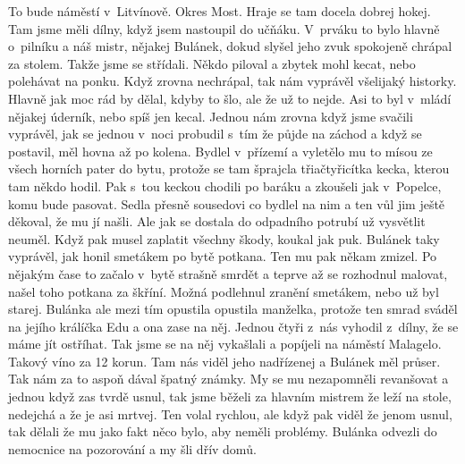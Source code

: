 
To bude náměstí v~Litvínově. Okres Most. Hraje se tam docela dobrej
hokej. Tam jsme měli dílny, když jsem nastoupil do učňáku. V~prváku to
bylo hlavně o~pilníku a náš mistr, nějakej Bulánek, dokud slyšel jeho
zvuk spokojeně chrápal za stolem. Takže jsme se střídali. Někdo
piloval a zbytek mohl kecat, nebo polehávat na ponku. Když zrovna
nechrápal, tak nám vyprávěl všelijaký historky. Hlavně jak moc rád by
dělal, kdyby to šlo, ale že už to nejde. Asi to byl v~mládí nějakej
úderník, nebo spíš jen kecal. Jednou nám zrovna když jsme svačili
vyprávěl, jak se jednou v~noci probudil s~tím že půjde na záchod a
když se postavil, měl hovna až po kolena. Bydlel v~přízemí a vyletělo
mu to mísou ze všech horních pater do bytu, protože se tam šprajcla
třiačtyřicítka kecka, kterou tam někdo hodil. Pak s~tou keckou chodili
po baráku a zkoušeli jak v~Popelce, komu bude pasovat. Sedla přesně
sousedovi co bydlel na nim a ten vůl jim ještě děkoval, že mu jí
našli. Ale jak se dostala do odpadního potrubí už vysvětlit neuměl.
Když pak musel zaplatit všechny škody, koukal jak puk. Bulánek taky
vyprávěl, jak honil smetákem po bytě potkana. Ten mu pak někam zmizel.
Po nějakým čase to začalo v~bytě strašně smrdět a teprve až se
rozhodnul malovat, našel toho potkana za škříní. Možná podlehnul
zranění smetákem, nebo už byl starej. Bulánka ale mezi tím opustila
opustila manželka, protože ten smrad sváděl na jejího králíčka Edu a
ona zase na něj. Jednou čtyři z~nás vyhodil z~dílny, že se máme jít
ostříhat. Tak jsme se na něj vykašlali a popíjeli na náměstí Malagelo.
Takový víno za 12 korun. Tam nás viděl jeho nadřízenej a Bulánek měl
průser. Tak nám za to aspoň dával špatný známky. My se mu nezapomněli
revanšovat a jednou když zas tvrdě usnul, tak jsme běželi za hlavním
mistrem že leží na stole, nedejchá a že je asi mrtvej. Ten volal
rychlou, ale když pak viděl že jenom usnul, tak dělali že mu jako fakt
něco bylo, aby neměli problémy. Bulánka odvezli do nemocnice na
pozorování a my šli dřív domů.


